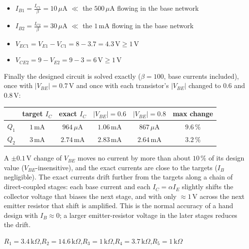 \documentclass[11pt]{article}
\newcommand{\solstep}[2]{\par\medskip{\color{stepc}\textbf{Step #1 --- #2}}\par\nopagebreak}
\begin{document}
\solstep{4}{Check the design}\begin{itemize}[leftmargin=*,itemsep=2pt]
\item $I_{B1} = \frac{I_{C1}}{\beta} = 10\,\mu \mathrm{A}$ $\ll$ the $500\,\mu \mathrm{A}$ flowing in the base network \checkmark
\item $I_{B2} = \frac{I_{C2}}{\beta} = 30\,\mu \mathrm{A}$ $\ll$ the $1\,\mathrm{m}\mathrm{A}$ flowing in the base network \checkmark
\item $V_{EC1} = V_{E1} - V_{C1} = 8 - 3.7 = 4.3\,\mathrm{V} \ge 1$\,V \checkmark
\item $V_{CE2} = 9 - V_{E2} = 9 - 3 = 6\,\mathrm{V} \ge 1$\,V \checkmark
\end{itemize}
Finally the designed circuit is solved exactly ($\beta=100$, base currents included), once with $|V_{BE}|=0.7$\,V and once with each transistor's $|V_{BE}|$ changed to $0.6$ and $0.8$\,V:\begin{center}\renewcommand{\arraystretch}{1.35}
\begin{tabular}{cccccc}
\toprule
 & target $I_C$ & exact $I_C$ & $|V_{BE}|=0.6$ & $|V_{BE}|=0.8$ & max change \\
\midrule
$Q_{1}$ & $1\,\mathrm{m}\mathrm{A}$ & $964\,\mu \mathrm{A}$ & $1.06\,\mathrm{m}\mathrm{A}$ & $867\,\mu \mathrm{A}$ & $9.6\,\%$ \\
$Q_{2}$ & $3\,\mathrm{m}\mathrm{A}$ & $2.74\,\mathrm{m}\mathrm{A}$ & $2.83\,\mathrm{m}\mathrm{A}$ & $2.64\,\mathrm{m}\mathrm{A}$ & $3.2\,\%$ \\
\bottomrule
\end{tabular}\end{center}
A $\pm0.1$\,V change of $V_{BE}$ moves no current by more than about $10\,\%$ of its design value ($V_{BE}$-insensitive), and the exact currents are close to the targets ($I_B$ negligible). The exact currents drift further from the targets along a chain of direct-coupled stages: each base current and each $I_C = \alpha I_E$ slightly shifts the collector voltage that biases the next stage, and with only $\approx1$\,V across the next emitter resistor that shift is amplified. This is the normal accuracy of a hand design with $I_B\approx0$; a larger emitter-resistor voltage in the later stages reduces the drift.
\begin{ansbox}
$R_{1} = 3.4\,\mathrm{k}\Omega$,\quad $R_{2} = 14.6\,\mathrm{k}\Omega$,\quad $R_{3} = 1\,\mathrm{k}\Omega$,\quad $R_{4} = 3.7\,\mathrm{k}\Omega$,\quad $R_{5} = 1\,\mathrm{k}\Omega$
\end{ansbox}
\end{document}
